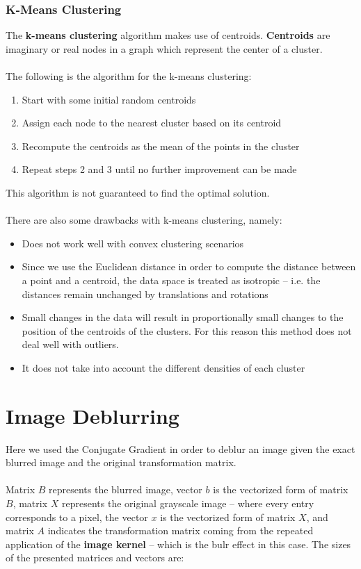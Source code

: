 \documentclass{article}
\begin{document}
\subsubsection{K-Means Clustering}
The \textbf{k-means clustering} algorithm makes use of centroids. \textbf{Centroids} are imaginary or real nodes in a graph which represent the center of a cluster. \\ \\
The following is the algorithm for the k-means clustering:

\begin{enumerate}
	\item Start with some initial random centroids
	\item Assign each node to the nearest cluster based on its centroid
	\item Recompute the centroids as the mean of the points in the cluster
	\item Repeat steps 2 and 3 until no further improvement can be made
\end{enumerate}
This algorithm is not guaranteed to find the optimal solution. \\ \\
There are also some drawbacks with k-means clustering, namely:

\begin{itemize}
	\item Does not work well with convex clustering scenarios
	\item Since we use the Euclidean distance in order to compute the distance between a point and a centroid, the data space is treated as isotropic -- i.e. the distances remain unchanged by translations and rotations
	\item Small changes in the data will result in proportionally small changes to the position of the centroids of the clusters. For this reason this method does not deal well with outliers.
	\item It does not take into account the different densities of each cluster
\end{itemize}

\section{Image Deblurring}
Here we used the Conjugate Gradient in order to deblur an image given the exact blurred image and the original transformation matrix. \\ \\
Matrix $B$ represents the blurred image, vector $b$ is the vectorized form of matrix $B$, matrix $X$ represents the original grayscale image -- where every entry corresponds to a pixel, the vector $x$ is the vectorized form of matrix $X$, and matrix $A$ indicates the transformation matrix coming from the repeated application of the \textbf{image kernel} -- which is the bulr effect in this case. The sizes of the presented matrices and vectors are:
\end{document}
